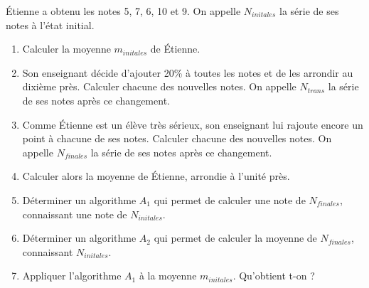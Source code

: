 
Étienne a obtenu les notes 5, 7, 6, 10 et 9. On appelle $N_{initales}$ la série de ses notes à l'état initial.


\begin{enumerate}
\item Calculer la moyenne $m_{initales}$ de Étienne.
\item Son enseignant décide d'ajouter 20\% à toutes les notes et de les arrondir au dixième près. Calculer chacune des nouvelles notes. On appelle $N_{trans}$ la série de ses notes après ce changement.
\item Comme Étienne est un élève très sérieux, son enseignant lui rajoute encore un point à chacune de ses notes. Calculer chacune des nouvelles notes. On appelle $N_{finales}$ la série de ses notes après ce changement.
\item Calculer alors la moyenne de Étienne, arrondie à l'unité près. 
\item Déterminer un algorithme $A_1$ qui permet de calculer une note de $N_{finales}$, connaissant une note de $N_{initales}$.
\item Déterminer un algorithme $A_2$ qui permet de calculer la moyenne de $N_{finales}$, connaissant $N_{initales}$.
\item Appliquer l'algorithme $A_1$ à la moyenne $m_{initales}$. Qu'obtient t-on ?
\end{enumerate} 